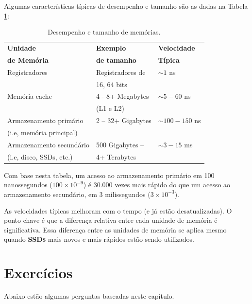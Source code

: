 Algumas características típicas de desempenho e tamanho são as dadas na Tabela \ref{tab:desempenho}:
\begin{table}[h]
	\centering
	\begin{tabular}{|l|l|l|}
		\hline
		\rowcolor[HTML]{C0C0C0} 
		\textbf{Unidade} & \textbf{Exemplo} & \textbf{Velocidade} \\ 
		\rowcolor[HTML]{C0C0C0} 
		\textbf{de Memória} & \textbf{de tamanho} & \textbf{Típica} \\ 
		Registradores & Registradores de  & $  \sim1 $ ns\\ 
		& 16, 64 bits &\\ \hline
		Memória cache & 4 - 8+ Megabytes  & $  \sim5-60 $ ns\\ 
		& (L1 e L2)& \\ \hline
		Armazenamento primário & 2 – 32+ Gigabytes & $  \sim100-150 $ ns\\ 
		 (i.e, memória principal) & &\\ \hline
		Armazenamento secundário  & 500 Gigabytes --  & $  \sim3-15 $ ms\\ 
		(i.e, disco, SSDs, etc.) & 4+ Terabytes& \\\hline
	\end{tabular}
	
	\caption{Desempenho e tamanho de memórias.}
	\label{tab:desempenho}
\end{table}

Com base nesta tabela, um acesso ao armazenamento primário em 100 nanossegundos
 ($ 100 \times 10^{-9} $) 
 é 30.000 vezes mais rápido do que um acesso ao armazenamento secundário, em 3 milissegundos ($3 \times 10^{-3}$).
 
 As velocidades típicas melhoram com o tempo (e já estão desatualizadas). O ponto chave é que a diferença relativa entre cada unidade de memória é significativa. Essa diferença entre as unidades de memória se aplica mesmo quando \textbf{SSDs} mais novos e mais rápidos estão sendo utilizados.

\section{Exercícios}
Abaixo estão algumas perguntas baseadas neste capítulo.


